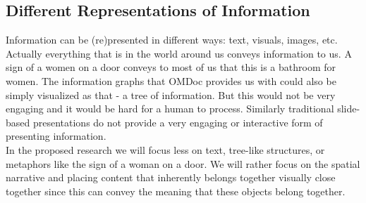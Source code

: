 \documentclass[twoside]{article}
\begin{document}
\subsection{Different Representations of Information}
\label{sec:inforep}

Information can be (re)presented in different ways: text, visuals, images, etc. Actually everything that is in the world around us conveys information to us. A sign of a women on a door conveys to most of us that this is a bathroom for women. The information graphs that OMDoc provides us with could also be simply visualized as that - a tree of information. But this would not be very engaging and it would be hard for a human to process. Similarly traditional slide-based presentations do not provide a very engaging or interactive form of presenting information. \\  

In the proposed research we will focus less on text, tree-like structures, or metaphors like the sign of a woman on a door. We will rather focus on the spatial narrative and placing content that inherently belongs together visually close together since this can convey the meaning that these objects belong together.\\
\end{document}

